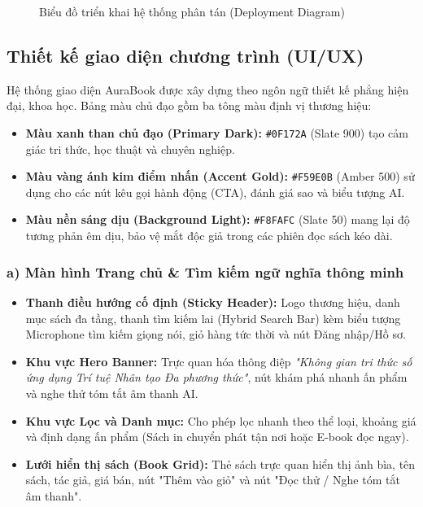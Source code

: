 \documentclass[11pt, a4paper]{report}
\begin{document}
\begin{figure}[H]
\caption{Biểu đồ triển khai hệ thống phân tán (Deployment Diagram)}
\label{fig:deploy_diagram}
\end{figure}

\subsection{Thiết kế giao diện chương trình (UI/UX)}

Hệ thống giao diện AuraBook được xây dựng theo ngôn ngữ thiết kế phẳng hiện đại, khoa học. Bảng màu chủ đạo gồm ba tông màu định vị thương hiệu:
\begin{itemize}
    \item \textbf{Màu xanh than chủ đạo (Primary Dark):} \texttt{\#0F172A} (Slate 900) tạo cảm giác tri thức, học thuật và chuyên nghiệp.
    \item \textbf{Màu vàng ánh kim điểm nhấn (Accent Gold):} \texttt{\#F59E0B} (Amber 500) sử dụng cho các nút kêu gọi hành động (CTA), đánh giá sao và biểu tượng AI.
    \item \textbf{Màu nền sáng dịu (Background Light):} \texttt{\#F8FAFC} (Slate 50) mang lại độ tương phản êm dịu, bảo vệ mắt độc giả trong các phiên đọc sách kéo dài.
\end{itemize}

\subsubsection{a) Màn hình Trang chủ \& Tìm kiếm ngữ nghĩa thông minh}
\begin{itemize}
    \item \textbf{Thanh điều hướng cố định (Sticky Header):} Logo thương hiệu, danh mục sách đa tầng, thanh tìm kiếm lai (Hybrid Search Bar) kèm biểu tượng Microphone tìm kiếm giọng nói, giỏ hàng tức thời và nút Đăng nhập/Hồ sơ.
    \item \textbf{Khu vực Hero Banner:} Trực quan hóa thông điệp \textit{"Không gian tri thức số ứng dụng Trí tuệ Nhân tạo Đa phương thức"}, nút khám phá nhanh ấn phẩm và nghe thử tóm tắt âm thanh AI.
    \item \textbf{Khu vực Lọc và Danh mục:} Cho phép lọc nhanh theo thể loại, khoảng giá và định dạng ấn phẩm (Sách in chuyển phát tận nơi hoặc E-book đọc ngay).
    \item \textbf{Lưới hiển thị sách (Book Grid):} Thẻ sách trực quan hiển thị ảnh bìa, tên sách, tác giả, giá bán, nút "Thêm vào giỏ" và nút "Đọc thử / Nghe tóm tắt âm thanh".
\end{itemize}
\end{document}

